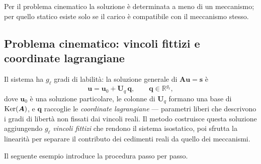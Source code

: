 Per il problema cinematico la soluzione è determinata a meno di un
meccanismo; per quello statico esiste solo se il carico è
compatibile con il meccanismo stesso.


\subsection{Problema cinematico: vincoli fittizi e	coordinate lagrangiane}
\label{sec:labile_cin}

Il sistema ha $g_\ell$ gradi di labilità: la soluzione generale di
$\bm{A}\bm{u} = \bm{s}$ è
\begin{equation}\label{eq:sol_labile_cin}
	\bm{u} = \bm{u}_0 + \bm{U}_q\,\bm{q},
	\qquad \bm{q} \in \mathbb{R}^{g_\ell},
\end{equation}
dove $\bm{u}_0$ è una soluzione particolare, le colonne di $\bm{U}_q$
formano una base di $\operatorname{Ker}(\bm{A})$, e $\bm{q}$ raccoglie le
\emph{coordinate lagrangiane} --- parametri liberi che descrivono i
gradi di libertà non fissati dai vincoli reali.
Il metodo costruisce questa soluzione aggiungendo $g_\ell$
\emph{vincoli fittizi} che rendono il sistema
isostatico, poi sfrutta la linearità per separare il contributo dei
cedimenti reali da quello dei meccanismi.

Il seguente esempio introduce la procedura passo per passo.

